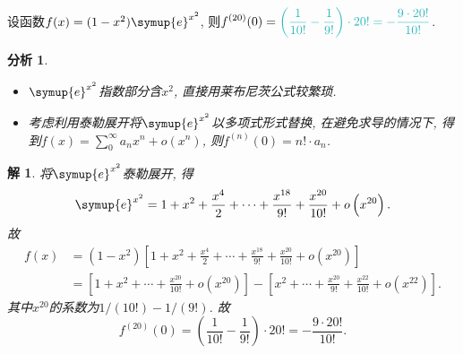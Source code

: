 \documentclass[a4paper, 12pt]{ctexart}
\theoremstyle{plain}
\theoremstyle{nonumberplain}
\newtheorem{solution}{解}
\theoremstyle{nonumberplain}
\newtheorem{analysis}{分析}
\theoremstyle{nonumberplain}
\newcommand{\ans}[1]{\textcolor{Aquamarine}{#1}}
\newcommand{\me}{\symup{e}}
\begin{document}
    \begin{problem}
        设函数$f(x)=(1-x^2)\me^{x^2}$, 则$\displaystyle f^{(20)}(0)=\ans{\left(\frac{1}{10!}-\frac{1}{9!}\right)\cdot 20!=-\frac{9\cdot 20!}{10!}}$.
    \end{problem}
    \begin{analysis}\hspace{\fill}
        \begin{itemize}
            \item $\me^{x^2}$指数部分含$x^2$, 直接用莱布尼茨公式较繁琐.
            \item 考虑利用泰勒展开将$\me^{x^2}$以多项式形式替换, 在避免求导的情况下, 得到$f(x)=\sum_{0}^{\infty}a_nx^n+o\left(x^n\right)$, 则$f^{(n)}(0)=n!\cdot a_n$.
        \end{itemize}
    \end{analysis}
    \begin{solution}
        将$\me^{x^2}$泰勒展开, 得
        \begin{equation}
            \me^{x^2}=1+x^2+\frac{x^4}{2}+\dotsb+\frac{x^{18}}{9!}+\frac{x^{20}}{10!}+o\left(x^{20}\right).
        \end{equation}
        故
        \begin{equation}
            \begin{aligned}
                f(x)
                &= \left(1-x^2\right)\left[1+x^2+\frac{x^4}{2}+\dotsb+\frac{x^{18}}{9!}+\frac{x^{20}}{10!}+o\left(x^{20}\right)\right]\\
                &= \left[1+x^2+\dotsb+\frac{x^{20}}{10!}+o\left(x^{20}\right)\right]-\left[x^2+\dotsb+\frac{x^{20}}{9!}+\frac{x^{22}}{10!}+o\left(x^{22}\right)\right].
            \end{aligned}
        \end{equation}
        其中$x^{20}$的系数为$1/(10!)-1/(9!)$. 故
        \begin{equation}
            f^{(20)}(0)=\left(\frac{1}{10!}-\frac{1}{9!}\right)\cdot 20!=-\frac{9\cdot 20!}{10!}.
        \end{equation}
    \end{solution}
\end{document}
